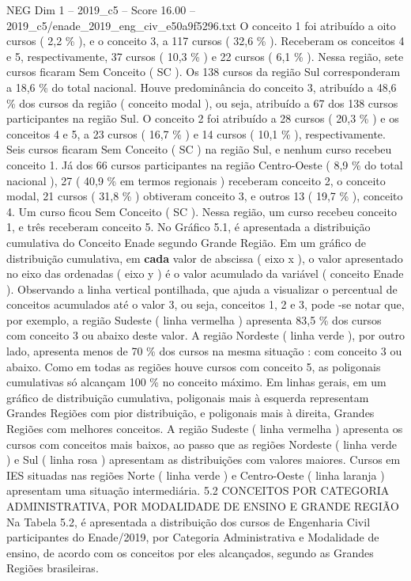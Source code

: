 \begin{textsample}{NEG Dim 1 – 2019\_c5 – Score 16.00 – 2019\_c5/enade\_2019\_eng\_civ\_e50a9f5296.txt}
O conceito 1 foi atribuído a oito cursos ( 2,2 \% ), e o conceito 3, a 117 cursos ( 32,6 \% ).
Receberam os conceitos 4 e 5, respectivamente, 37 cursos ( 10,3 \% ) e 22 cursos ( 6,1 \% ).
Nessa região, sete cursos ficaram Sem Conceito ( SC ).
Os 138 cursos da região Sul corresponderam a 18,6 \% do total nacional.
Houve predominância do conceito 3, atribuído a 48,6 \% dos cursos da região ( conceito modal ), ou seja, atribuído a 67 dos 138 cursos participantes na região Sul.
O conceito 2 foi atribuído a 28 cursos ( 20,3 \% ) e os conceitos 4 e 5, a 23 cursos ( 16,7 \% ) e 14 cursos ( 10,1 \% ), respectivamente.
Seis cursos ficaram Sem Conceito ( SC ) na região Sul, e nenhum curso recebeu conceito 1.
Já dos 66 cursos participantes na região Centro-Oeste ( 8,9 \% do total nacional ), 27 ( 40,9 \% em termos regionais ) receberam conceito 2, o conceito modal, 21 cursos ( 31,8 \% ) obtiveram conceito 3, e outros 13 ( 19,7 \% ), conceito 4.
Um curso ficou Sem Conceito ( SC ).
Nessa região, um curso recebeu conceito 1, e três receberam conceito 5.
No Gráfico 5.1, é apresentada a distribuição cumulativa do Conceito Enade segundo Grande Região.
Em um gráfico de distribuição cumulativa, em \textbf{cada} valor de abscissa ( eixo x ), o valor apresentado no eixo das ordenadas ( eixo y ) é o valor acumulado da variável ( conceito Enade ).
Observando a linha vertical pontilhada, que ajuda a visualizar o percentual de conceitos acumulados até o valor 3, ou seja, conceitos 1, 2 e 3, pode -se notar que, por exemplo, a região Sudeste ( linha vermelha ) apresenta 83,5 \% dos cursos com conceito 3 ou abaixo deste valor.
A região Nordeste ( linha verde ), por outro lado, apresenta menos de 70 \% dos cursos na mesma situação : com conceito 3 ou abaixo.
Como em todas as regiões houve cursos com conceito 5, as poligonais cumulativas só alcançam 100 \% no conceito máximo.
Em linhas gerais, em um gráfico de distribuição cumulativa, poligonais mais à esquerda representam Grandes Regiões com pior distribuição, e poligonais mais à direita, Grandes Regiões com melhores conceitos.
A região Sudeste ( linha vermelha ) apresenta os cursos com conceitos mais baixos, ao passo que as regiões Nordeste ( linha verde ) e Sul ( linha rosa ) apresentam as distribuições com valores maiores.
Cursos em IES situadas nas regiões Norte ( linha verde ) e Centro-Oeste ( linha laranja ) apresentam uma situação intermediária. 5.2 CONCEITOS POR CATEGORIA ADMINISTRATIVA, POR MODALIDADE DE ENSINO E GRANDE REGIÃO Na Tabela 5.2, é apresentada a distribuição dos cursos de Engenharia Civil participantes do Enade/2019, por Categoria Administrativa e Modalidade de ensino, de acordo com os conceitos por eles alcançados, segundo as Grandes Regiões brasileiras.

\end{textsample}

